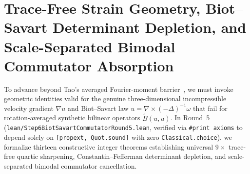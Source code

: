 \documentclass[11pt]{article}
\theoremstyle{plain}
\theoremstyle{definition}
\begin{document}
\section{Trace-Free Strain Geometry, Biot--Savart Determinant Depletion, and Scale-Separated Bimodal Commutator Absorption}\label{sec:step6}

To advance beyond Tao's averaged Fourier-moment barrier~\cite{tao2016}, we must invoke geometric identities valid for the genuine three-dimensional incompressible velocity gradient $\nabla u$ and Biot--Savart law $u = \nabla \times (-\Delta)^{-1}\omega$ that fail for rotation-averaged synthetic bilinear operators $\tilde{B}(u,u)$. In Round~5 (\texttt{lean/\allowbreak Step6BiotSavart\allowbreak CommutatorRound5.lean}, verified via \texttt{\#print axioms} to depend solely on \texttt{[propext, Quot.sound]} with zero \texttt{Classical.choice}), we formalize thirteen constructive integer theorems establishing universal $9\times$ trace-free quartic sharpening, Constantin--Fefferman determinant depletion, and scale-separated bimodal commutator cancellation.
\end{document}

